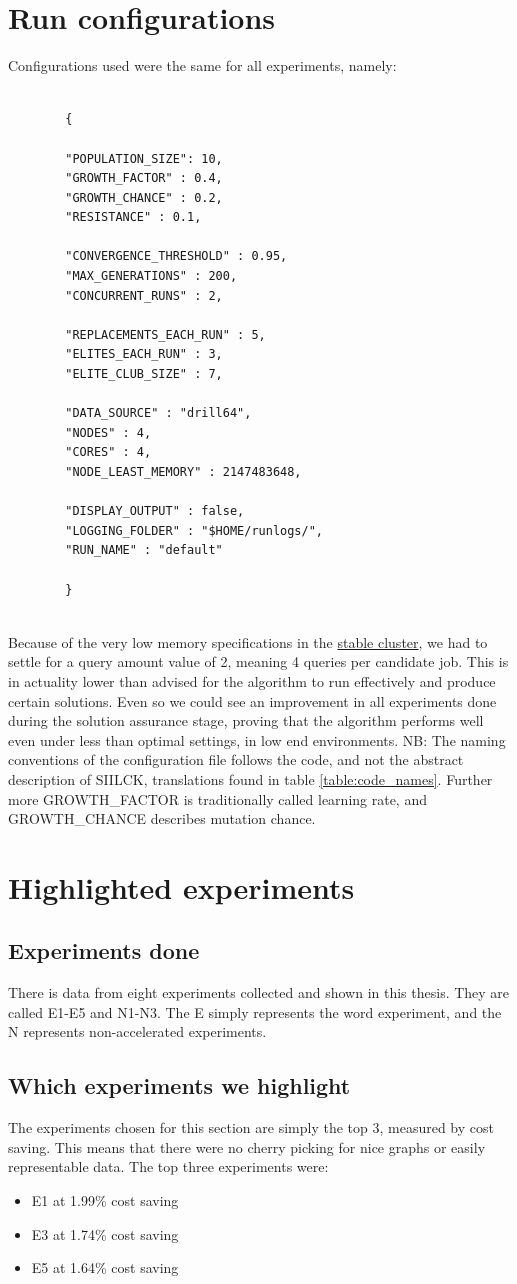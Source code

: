\documentclass[a4paper,english]{report}
\begin{document}
	\section{Run configurations}
	Configurations used were the same for all experiments, namely:
	\begin{verbatim}
	
		{
		
		"POPULATION_SIZE": 10,
		"GROWTH_FACTOR" : 0.4,
		"GROWTH_CHANCE" : 0.2,
		"RESISTANCE" : 0.1,
		
		"CONVERGENCE_THRESHOLD" : 0.95,
		"MAX_GENERATIONS" : 200,
		"CONCURRENT_RUNS" : 2,
		
		"REPLACEMENTS_EACH_RUN" : 5,
		"ELITES_EACH_RUN" : 3,
		"ELITE_CLUB_SIZE" : 7,
		
		"DATA_SOURCE" : "drill64",
		"NODES" : 4,
		"CORES" : 4,
		"NODE_LEAST_MEMORY" : 2147483648,
		
		"DISPLAY_OUTPUT" : false,
		"LOGGING_FOLDER" : "$HOME/runlogs/",
		"RUN_NAME" : "default"
		
		}
		
	\end{verbatim}
	Because of the very low memory specifications in the \hyperref[table:cluster_stable]{stable cluster}, we had to settle for a query amount value of 2, meaning 4 queries per candidate job. This is in actuality lower than advised for the algorithm to run effectively and produce certain solutions. Even so we could see an improvement in all experiments done during the solution assurance stage, proving that the algorithm performs well even under less than optimal settings, in low end environments. NB: The naming conventions of the configuration file follows the code, and not the abstract description of SIILCK, translations found in table \ref{table:code_names}. Further more GROWTH\_FACTOR is traditionally called learning rate, and GROWTH\_CHANCE describes mutation chance.
	\clearpage
	\section{Highlighted experiments}
	\subsection{Experiments done}
	There is data from eight experiments collected and shown in this thesis. They are called E1-E5 and N1-N3. The E simply represents the word experiment, and the N represents non-accelerated experiments.
	\label{sec:highlighted}
	\subsection{Which experiments we highlight}
	The experiments chosen for this section are simply the top 3, measured by cost saving. This means that there were no cherry picking for nice graphs or easily representable data. The top three experiments were:
	\begin{itemize}
		\item E1 at 1.99\% cost saving
		\item E3 at 1.74\% cost saving
		\item E5 at 1.64\% cost saving
	\end{itemize}
	\pagebreak
\end{document}
